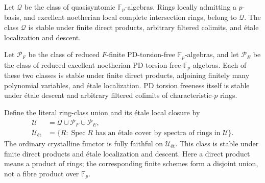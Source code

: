 \begin{proposition}
\label{B:positive-closure}
Let $\mathcal Q$ be the class of quasisyntomic
$\mathbb F_p$-algebras. Rings locally admitting a $p$-basis, and
excellent noetherian local complete intersection rings, belong to
$\mathcal Q$. The class $\mathcal Q$ is stable under finite direct
products, arbitrary filtered colimits, and \'etale localization
and descent.

Let $\mathcal P_F$ be the class of reduced $F$-finite PD-torsion-free
$\mathbb F_p$-algebras, and let $\mathcal P_E$ be the class of reduced
excellent noetherian PD-torsion-free $\mathbb F_p$-algebras. Each of
these two classes is stable under finite direct products, adjoining
finitely many polynomial variables, and \'etale localization.
PD torsion freeness itself is stable under \'etale descent and arbitrary
filtered colimits of characteristic-$p$ rings.

Define the literal ring-class union and its \'etale local closure by
\begin{align*}
 \mathcal U&=\mathcal Q\cup\mathcal P_F\cup\mathcal P_E,\\
 \mathcal U_{\text{ét}}
 &=\{R:\operatorname{Spec}R\text{ has an \'etale cover by spectra
 of rings in }\mathcal U\}.
\end{align*}
The ordinary crystalline functor is fully faithful on
$\mathcal U_{\text{ét}}$. This class is stable under
finite direct products and \'etale localization and descent.
Here a direct product means a product of rings; the corresponding
finite schemes form a disjoint union, not a fibre product over
$\mathbb F_p$.
\end{proposition}

